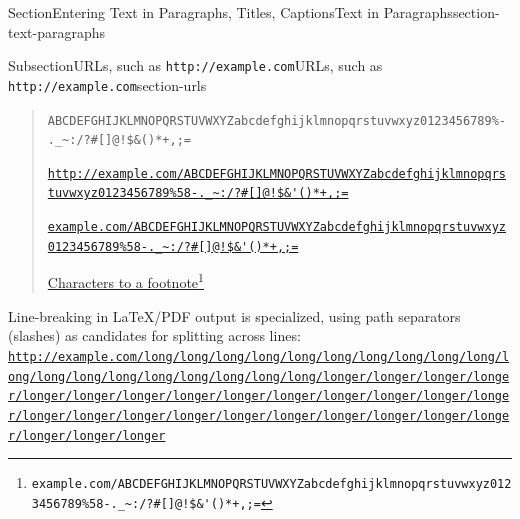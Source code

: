 \documentclass[twoside,10pt,]{article}
\newcommand{\mono}[1]{\texttt{#1}}
\numberwithin{equation}{section}
\begin{document}
\begin{sectionptx}{Section}{Entering Text in Paragraphs, Titles, Captions}{}{Text in Paragraphs}{}{}{section-text-paragraphs}
\begin{subsectionptx}{Subsection}{URLs, such as \mono{http://example.com}}{}{URLs, such as \mono{http://example.com}}{}{}{section-urls}
\begin{quote}
\par
\mono{ABCDEFGHIJKLMNOPQRSTUVWXYZabcdefghijklmnopqrstuvwxyz0123456789\%-.\_\textasciitilde{}:/?\#[]@!\$\&\textquotesingle{}()*+,;=}%
\par
\href{http://example.com/ABCDEFGHIJKLMNOPQRSTUVWXYZabcdefghijklmnopqrstuvwxyz0123456789\%58-._\~:/?\#[]@!$\&'()*+,;=}{\nolinkurl{http://example.com/ABCDEFGHIJKLMNOPQRSTUVWXYZabcdefghijklmnopqrstuvwxyz0123456789\%58-._\~:/?\#[]@!$\&'()*+,;=}}%
\par
\href{http://example.com/ABCDEFGHIJKLMNOPQRSTUVWXYZabcdefghijklmnopqrstuvwxyz0123456789\%58-._\~:/?\#[]@!$\&'()*+,;=}{\nolinkurl{example.com/ABCDEFGHIJKLMNOPQRSTUVWXYZabcdefghijklmnopqrstuvwxyz0123456789\%58-._\~:/?\#[]@!$\&'()*+,;=}}%
\par
\href{http://example.com/ABCDEFGHIJKLMNOPQRSTUVWXYZabcdefghijklmnopqrstuvwxyz0123456789\%58-._\~:/?\#[]@!$\&'()*+,;=}{Characters to a footnote}\footnote{\nolinkurl{example.com/ABCDEFGHIJKLMNOPQRSTUVWXYZabcdefghijklmnopqrstuvwxyz0123456789\%58-._\~:/?\#[]@!$\&'()*+,;=}\label{section-urls-8-5-2}}%
\end{quote}
Line-breaking in \LaTeX{}\slash{}PDF output is specialized, using path separators (slashes) as candidates for splitting across lines: \href{http://example.com/long/long/long/long/long/long/long/long/long/long/long/long/long/long/long/long/long/long/long/longer/longer/longer/longer/longer/longer/longer/longer/longer/longer/longer/longer/longer/longer/longer/longer/longer/longer/longer/longer/longer/longer/longer/longer/longer/longer/longer}{\nolinkurl{http://example.com/long/long/long/long/long/long/long/long/long/long/long/long/long/long/long/long/long/long/long/longer/longer/longer/longer/longer/longer/longer/longer/longer/longer/longer/longer/longer/longer/longer/longer/longer/longer/longer/longer/longer/longer/longer/longer/longer/longer/longer}}%
\par

\end{subsectionptx}
\end{sectionptx}
\end{document}
